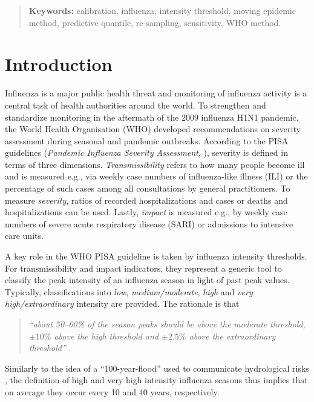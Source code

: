 \documentclass[12pt]{article}
\begin{document}
\bigskip

\begin{quote}
\textbf{Keywords:} calibration, influenza, intensity threshold, moving epidemic method, predictive quantile, re-sampling, sensitivity, WHO method.
\end{quote}

\newpage


\section{Introduction}
\label{sec:introduction}

Influenza is a major public health threat and monitoring of influenza activity is a central task of health authorities around the world. To strengthen and standardize monitoring in the aftermath of the 2009 influenza H1N1 pandemic, the World Health Organisation (WHO) developed recommendations on severity assessment during seasonal and pandemic outbreaks. According to the PISA guidelines (\textit{Pandemic Influenza Severity Assessment}, \citealt{WHO2014}), severity is defined in terms of three dimensions. \textit{Transmissibility} refers to how many people become ill and is measured e.g., via weekly case numbers of influenza-like illness (ILI) or the percentage of such cases among all consultations by general practitioners. To measure \textit{severity}, ratios of recorded hospitalizations and cases or deaths and hospitalizations can be used. Lastly, \textit{impact} is measured e.g., by weekly case numbers of severe acute respiratory disease (SARI) or admissions to intensive care units.

A key role in the WHO PISA guideline is taken by influenza intensity thresholds. For transmissibility and impact indicators, they represent a generic tool to classify the peak intensity of an influenza season in light of past peak values. Typically, classifications into \textit{low}, \textit{medium/moderate}, \textit{high} and \textit{very high/extraordinary} intensity are provided. The rationale is that
\begin{quote}
\textit{``about 50--60\% of the season peaks should be above the moderate threshold, $\pm 10\%$ above the high threshold and $\pm 2.5\%$ above the extraordinary threshold''} \citep[p.10]{WHO2017}.
\end{quote}
Similarly to the idea of a ``100-year-flood'' used to communicate hydrological risks \citep{Holmes2010}, the definition of high and very high intensity influenza seasons thus implies that on average they occur every 10 and 40 years, respectively.
\end{document}
